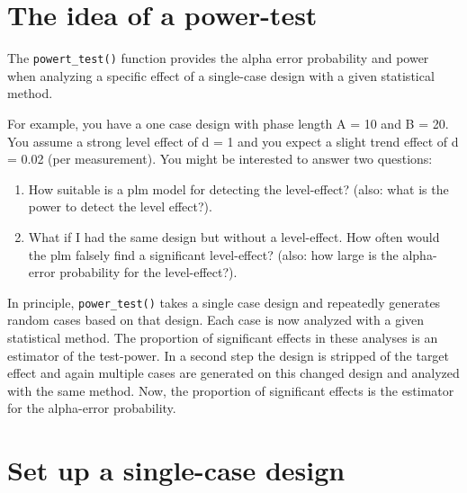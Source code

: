 \documentclass[
  letterpaper,
  DIV=11,
  numbers=noendperiod]{scrreprt}
\providecommand{\tightlist}{%
  \setlength{\itemsep}{0pt}\setlength{\parskip}{0pt}}\usepackage{longtable,booktabs,array}
\begin{document}
\hypertarget{the-idea-of-a-power-test}{%
\section{The idea of a power-test}\label{the-idea-of-a-power-test}}

The \texttt{powert\_test()} function provides the alpha error
probability and power when analyzing a specific effect of a single-case
design with a given statistical method.

For example, you have a one case design with phase length A = 10 and B =
20. You assume a strong level effect of d = 1 and you expect a slight
trend effect of d = 0.02 (per measurement). You might be interested to
answer two questions:

\begin{enumerate}
\def\labelenumi{\arabic{enumi}.}
\tightlist
\item
  How suitable is a plm model for detecting the level-effect? (also:
  what is the power to detect the level effect?).
\item
  What if I had the same design but without a level-effect. How often
  would the plm falsely find a significant level-effect? (also: how
  large is the alpha-error probability for the level-effect?).
\end{enumerate}

In principle, \texttt{power\_test()} takes a single case design and
repeatedly generates random cases based on that design. Each case is now
analyzed with a given statistical method. The proportion of significant
effects in these analyses is an estimator of the test-power. In a second
step the design is stripped of the target effect and again multiple
cases are generated on this changed design and analyzed with the same
method. Now, the proportion of significant effects is the estimator for
the alpha-error probability.

\hypertarget{set-up-a-single-case-design}{%
\section{Set up a single-case
design}\label{set-up-a-single-case-design}}
\end{document}
